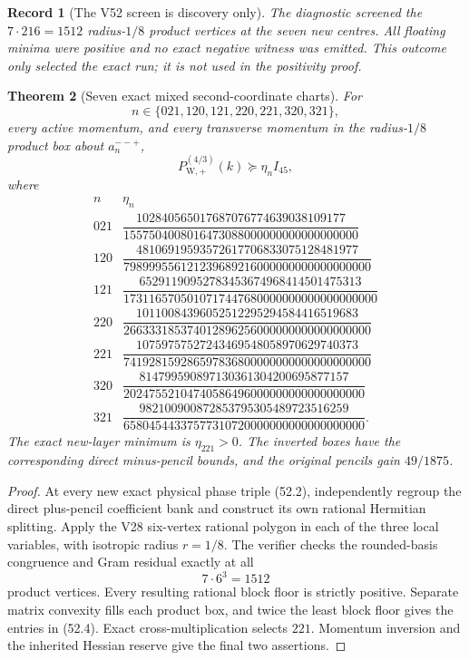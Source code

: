 \documentclass[11pt,oneside]{article}
\newtheorem{theorem}{Theorem}[section]
\newtheorem{record}[theorem]{Record}
\theoremstyle{definition}
\theoremstyle{remark}
\begin{document}
\begin{record}[The V52 screen is discovery only]
\label{rec:newv52-screen}
The diagnostic screened the \(7\cdot216=1512\) radius-\(1/8\)
product vertices at the seven new centres.  All floating minima
were positive and no exact negative witness was emitted.  This
outcome only selected the exact run; it is not used in the
positivity proof.
\end{record}

\begin{theorem}[Seven exact mixed second-coordinate charts]
\label{thm:newv52-seven-charts}
For
\[
 n\in\{021,120,121,220,221,320,321\},
\]
every active momentum, and every transverse momentum in the
radius-\(1/8\) product box about \(a_n^{--+}\),
\[
 P_{\mathrm W,+}^{(4/3)}(k)\succeq\eta_n I_{45},      \tag{52.3}
\]
where
\[
\begin{array}{c|c}
n&\eta_n\\ \hline
021&\dfrac{102840565017687076774639038109177}
{1557504008016473088000000000000000000}\\[5pt]
120&\dfrac{48106919593572617706833075128481977}
{798999556121239689216000000000000000000}\\[5pt]
121&\dfrac{65291190952783453674968414501475313}
{1731165705010717447680000000000000000000}\\[5pt]
220&\dfrac{10110084396052512295294584416519683}
{266333185374012896256000000000000000000}\\[5pt]
221&\dfrac{10759757527243469548058970629740373}
{741928159286597836800000000000000000000}\\[5pt]
320&\dfrac{814799590897130361304200695877157}
{20247552104740586496000000000000000000}\\[5pt]
321&\dfrac{982100900872853795305489723516259}
{65804544337577310720000000000000000000}.
\end{array}                                             \tag{52.4}
\]
The exact new-layer minimum is \(\eta_{221}>0\).  The inverted
boxes have the corresponding direct minus-pencil bounds, and the
original pencils gain \(49/1875\).
\end{theorem}

\begin{proof}
At every new exact physical phase triple (52.2), independently
regroup the direct plus-pencil coefficient bank and construct its
own rational Hermitian splitting.  Apply the V28 six-vertex
rational polygon in each of the three local variables, with
isotropic radius \(r=1/8\).  The verifier checks the rounded-basis
congruence and Gram residual exactly at all
\[
 7\cdot6^3=1512                                       \tag{52.5}
\]
product vertices.  Every resulting rational block floor is
strictly positive.  Separate matrix convexity fills each product
box, and twice the least block floor gives the entries in (52.4).
Exact cross-multiplication selects \(221\).  Momentum inversion and
the inherited Hessian reserve give the final two assertions.
\end{proof}
\end{document}
